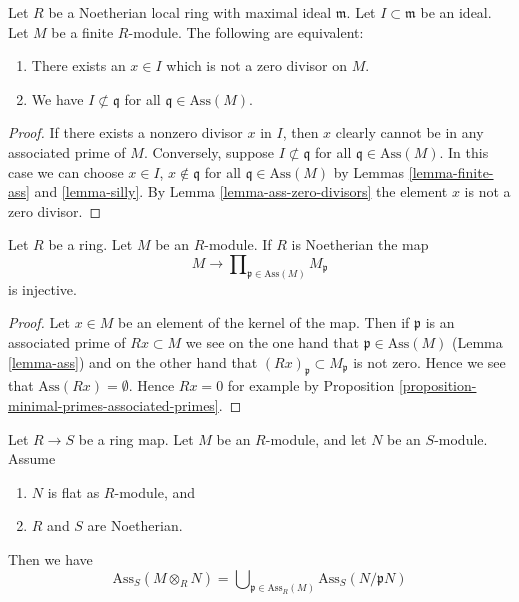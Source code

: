\begin{lemma}
\label{lemma-ideal-nonzerodivisor}
Let $R$ be a Noetherian local ring with
maximal ideal $\mathfrak m$. Let $I \subset \mathfrak m$
be an ideal. Let $M$ be a finite $R$-module.
The following are equivalent:
\begin{enumerate}
\item There exists an $x \in I$ which is not a zero divisor on $M$.
\item We have $I \not \subset \mathfrak q$ for all
$\mathfrak q \in \text{Ass}(M)$.
\end{enumerate}
\end{lemma}

\begin{proof}
If there exists a nonzero divisor $x$ in $I$,
then $x$ clearly cannot be in any associated
prime of $M$. Conversely, suppose $I \not \subset \mathfrak q$
for all $\mathfrak q \in \text{Ass}(M)$. In this case we can
choose $x \in I$, $x \not \in \mathfrak q$ for all
$\mathfrak q \in \text{Ass}(M)$ by Lemmas
\ref{lemma-finite-ass} and \ref{lemma-silly}.
By Lemma \ref{lemma-ass-zero-divisors} the element $x$
is not a zero divisor.
\end{proof}

\begin{lemma}
\label{lemma-zero-at-ass-zero}
Let $R$ be a ring. Let $M$ be an $R$-module. If $R$ is Noetherian
the map
$$
M
\longrightarrow
\prod\nolimits_{\mathfrak p \in \text{Ass}(M)} M_{\mathfrak p}
$$
is injective.
\end{lemma}

\begin{proof}
Let $x \in M$ be an element of the kernel of the map.
Then if $\mathfrak p$ is an associated prime of $Rx \subset M$
we see on the one hand that $\mathfrak p \in \text{Ass}(M)$
(Lemma \ref{lemma-ass}) and
on the other hand that $(Rx)_{\mathfrak p} \subset M_{\mathfrak p}$
is not zero. Hence we see that $\text{Ass}(Rx) = \emptyset$.
Hence $Rx = 0$ for example by
Proposition \ref{proposition-minimal-primes-associated-primes}.
\end{proof}

\begin{lemma}
\label{lemma-bourbaki}
Let $R \to S$ be a ring map.
Let $M$ be an $R$-module, and let $N$ be an $S$-module.
Assume
\begin{enumerate}
\item $N$ is flat as $R$-module, and
\item $R$ and $S$ are Noetherian.
\end{enumerate}
Then we have
$$
\text{Ass}_S(M \otimes_R N) 
=
\bigcup\nolimits_{\mathfrak p \in \text{Ass}_R(M)} \text{Ass}_S(N/\mathfrak pN)
$$
\end{lemma}

